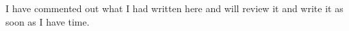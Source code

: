 \documentclass[../paper.tex]{subfiles}
\begin{document}
I have commented out what I had written here and will review it and write it as
soon as I have time.



\end{document}
